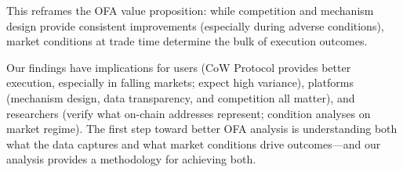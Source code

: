 \documentclass[12pt,a4paper]{article}
\begin{document}
This reframes the OFA value proposition: while competition and mechanism design provide consistent improvements (especially during adverse conditions), market conditions at trade time determine the bulk of execution outcomes.

Our findings have implications for users (CoW Protocol provides better execution, especially in falling markets; expect high variance), platforms (mechanism design, data transparency, and competition all matter), and researchers (verify what on-chain addresses represent; condition analyses on market regime). The first step toward better OFA analysis is understanding both what the data captures and what market conditions drive outcomes---and our analysis provides a methodology for achieving both.

\newpage

\end{document}
